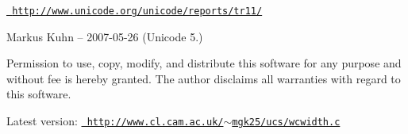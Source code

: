 \href{http://www.unicode.org/unicode/reports/tr11/}{\texttt{ http\+://www.\+unicode.\+org/unicode/reports/tr11/}}

Markus Kuhn -- 2007-\/05-\/26 (Unicode 5.)

Permission to use, copy, modify, and distribute this software for any purpose and without fee is hereby granted. The author disclaims all warranties with regard to this software.

Latest version\+: \href{http://www.cl.cam.ac.uk/~mgk25/ucs/wcwidth.c}{\texttt{ http\+://www.\+cl.\+cam.\+ac.\+uk/$\sim$mgk25/ucs/wcwidth.\+c}} 